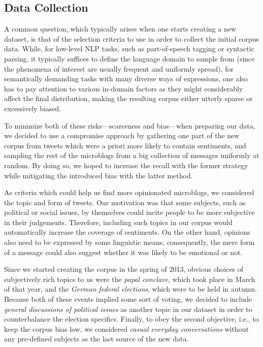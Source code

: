\subsection{Data Collection}

A common question, which typically arises when one starts creating a
new dataset, is that of the selection criteria to use in order to
collect the initial corpus data.  While, for low-level NLP tasks, such
as part-of-speech tagging or syntactic parsing, it typically suffices
to define the language domain to sample from (since the phenomena of
interest are usually frequent and uniformly spread), for semantically
demanding tasks with many diverse ways of expressions, one also has to
pay attention to various in-domain factors as they might considerably
affect the final distribution, making the resulting corpus either
utterly sparse or excessively biased.

To minimize both of these risks---scarceness and bias---when preparing
our data, we decided to use a compromise approach by gathering one
part of the new corpus from tweets which were a priori more likely to
contain sentiments, and sampling the rest of the microblogs from a big
collection of messages uniformly at random.  By doing so, we hoped to
increase the recall with the former strategy while mitigating the
introduced bias with the latter method.

As criteria which could help us find more opinionated microblogs, we
considered the topic and form of tweets.  Our motivation was that some
subjects, such as political or social issues, by themselves could
incite people to be more subjective in their judgements.  Therefore,
including such topics in our corpus would automatically increase the
coverage of sentiments.  On the other hand, opinions also need to be
expressed by some linguistic means, consequently, the mere form of a
message could also suggest whether it was likely to be emotional or
not.

Since we started creating the corpus in the spring of 2013, obvious
choices of subjectively rich topics to us were the \emph{papal
  conclave}, which took place in March of that year, and the
\emph{German federal elections}, which were to be held in autumn.
Because both of these events implied some sort of voting, we decided
to include \emph{general discussions of political issues} as another
topic in our dataset in order to counterbalance the election
specifics.  Finally, to obey the second objective, i.e., to keep the
corpus bias low, we considered \emph{casual everyday conversations}
without any pre-defined subjects as the last source of the new data.

